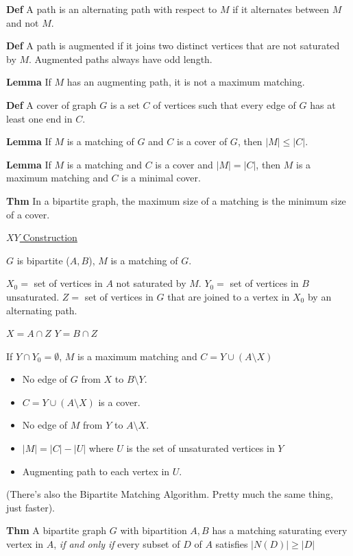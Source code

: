 \documentclass{article}
\begin{document}
\textbf{Def} A path is an alternating path with respect to $M$ if it alternates between $M$ and not $M$. 

\textbf{Def} A path is augmented if it joins two distinct vertices that are not saturated by $M$. Augmented paths always have odd length. 

\textbf{Lemma} If $M$ has an augmenting path, it is not a maximum matching. 

\textbf{Def} A cover of graph $G$ is a set $C$ of vertices such that every edge of $G$ has at least one end in $C$. 

\textbf{Lemma} If $M$ is a matching of $G$ and $C$ is a cover of $G$, then $|M| \le |C|$. 

\textbf{Lemma} If $M$ is a matching and $C$ is a cover and $|M| = |C|$, then $M$ is a maximum matching and $C$ is a minimal cover. 

\textbf{Thm} In a bipartite graph, the maximum size of a matching is the minimum size of a cover. 

\underline{$XY$ Construction}

$G$ is bipartite ($A, B$), $M$ is a matching of $G$. 

$X_0 = $ set of vertices in $A$ not saturated by $M$. 
$Y_0 = $ set of vertices in $B$ unsaturated.
$Z = $ set of vertices in $G$ that are joined to a vertex in $X_0$ by an alternating path. 

$X = A \cap Z$
$Y = B \cap Z$

If $Y \cap Y_0 = \emptyset$, $M$ is a maximum matching and $C = Y \cup (A \setminus X)$

\begin{itemize}
    \item No edge of $G$ from $X$ to $B \setminus Y$.
    \item $C = Y \cup (A \setminus X)$ is a cover.
    \item No edge of $M$ from $Y$ to $A \setminus X$.
    \item $|M| = |C| - |U|$ where $U$ is the set of unsaturated vertices in $Y$
    \item Augmenting path to each vertex in $U$. 
\end{itemize}

(There's also the Bipartite Matching Algorithm. Pretty much the same thing, just faster). 

\textbf{Thm} A bipartite graph $G$ with bipartition $A, B$ has a matching saturating every vertex in $A$, \textit{if and only if} every subset of $D$ of $A$ satisfies $|N(D)| \ge |D|$
\end{document}
